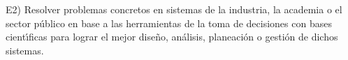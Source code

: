 E2) Resolver problemas concretos en sistemas de la industria, la
academia o el sector p\'{u}blico en base a las herramientas de la toma
de decisiones con bases cient\'{\i}ficas para lograr el mejor dise\~{n}o,
an\'{a}lisis, planeaci\'{o}n o gesti\'{o}n de dichos sistemas.
